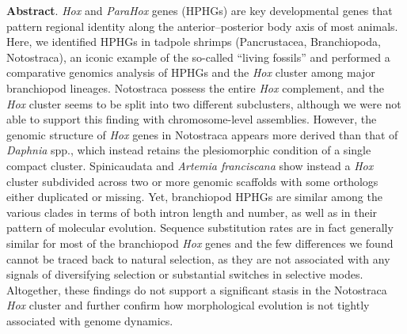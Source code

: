 \textbf{Abstract}. \textit{Hox} and \textit{ParaHox} genes (HPHGs) are key developmental genes that pattern regional identity along the anterior–posterior body axis of most animals. Here, we identified HPHGs in tadpole shrimps (Pancrustacea, Branchiopoda, Notostraca), an iconic example of the so-called “living fossils” and performed a comparative genomics analysis of HPHGs and the \textit{Hox} cluster among major branchiopod lineages. Notostraca possess the entire \textit{Hox} complement, and the \textit{Hox} cluster seems to be split into two different subclusters, although we were not able to support this finding with chromosome-level assemblies. However, the genomic structure of \textit{Hox} genes in Notostraca appears more derived than that of \textit{Daphnia} spp., which instead retains the plesiomorphic condition of a single compact cluster. Spinicaudata and \textit{Artemia franciscana} show instead a \textit{Hox} cluster subdivided across two or more genomic scaffolds with some orthologs either duplicated or missing. Yet, branchiopod HPHGs are similar among the various clades in terms of both intron length and number, as well as in their pattern of molecular evolution. Sequence substitution rates are in fact generally similar for most of the branchiopod \textit{Hox} genes and the few differences we found cannot be traced back to natural selection, as they are not associated with any signals of diversifying selection or substantial switches in selective modes. Altogether, these findings do not support a significant stasis in the Notostraca \textit{Hox} cluster and further confirm how morphological evolution is not tightly associated with genome dynamics.

\clearpage



